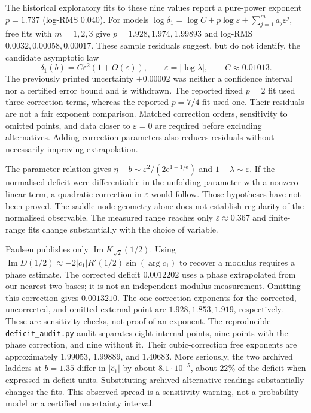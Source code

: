 \documentclass[11pt,a4paper]{article}
\theoremstyle{definition}
\newcommand{\Rr}{R}
\newcommand{\Kk}{K}
\newcommand{\eee}{\mathrm{e}}
\begin{document}
The historical exploratory fits to these nine values report a pure-power
exponent $p=1.737$ (log-RMS $0.040$).  For models
$\log\delta_1=\log C+p\log\varepsilon+\sum_{j=1}^m a_j\varepsilon^j$,
free fits with $m=1,2,3$ give $p=1.928,1.974,1.99893$ and log-RMS
$0.0032,0.00058,0.00017$.  These sample residuals suggest, but do not
identify, the candidate asymptotic law
\begin{equation}\label{eq:deficit}
  \delta_1(b)=C\varepsilon^2(1+O(\varepsilon)),\qquad
  \varepsilon=|\log\lambda|,\qquad C\approx0.01013.
\end{equation}
The previously printed uncertainty $\pm0.00002$ was neither a confidence
interval nor a certified error bound and is withdrawn.  The reported fixed
$p=2$ fit used three correction terms, whereas the reported $p=7/4$ fit used
one.  Their residuals are not a fair exponent comparison.  Matched correction
orders, sensitivity to omitted points, and data closer to $\varepsilon=0$
are required before excluding alternatives.  Adding correction parameters
also reduces residuals without necessarily improving extrapolation.

The parameter relation gives
$\eta-b\sim\varepsilon^2/(2\eee^{1-1/\eee})$ and $1-\lambda\sim\varepsilon$.
If the normalised deficit were differentiable in the unfolding parameter
with a nonzero linear term, a quadratic correction in $\varepsilon$ would
follow.  Those hypotheses have not been proved.  The saddle-node geometry
alone does not establish regularity of the normalised observable.
The measured range reaches only $\varepsilon\approx0.367$ and finite-range
fits change substantially with the choice of variable.

Paulsen publishes only $\operatorname{Im}\Kk_{\sqrt2}(1/2)$.  Using
$\operatorname{Im}D(1/2)\approx-2|c_1|\Rr'(1/2)\sin(\arg c_1)$ to
recover a modulus requires a phase estimate.  The corrected deficit
$0.0012202$ uses a phase extrapolated from our nearest two bases; it is not
an independent modulus measurement.  Omitting this correction gives
$0.0013210$.  The one-correction exponents for the corrected, uncorrected,
and omitted external point are $1.928,1.853,1.919$, respectively.
These are sensitivity checks, not proof of an exponent.  The reproducible
\texttt{deficit\_audit.py} audit separates eight internal points, nine points
with the phase correction, and nine without it.  Their cubic-correction
free exponents are approximately $1.99053$, $1.99889$, and $1.40683$.
More seriously, the two archived ladders at $b=1.35$ differ in
$|\hat c_1|$ by about $8.1\cdot10^{-5}$, about $22\%$ of the deficit
when expressed in deficit units.  Substituting archived alternative readings
substantially changes the fits.  This observed spread is a sensitivity
warning, not a probability model or a certified uncertainty interval.
\end{document}

